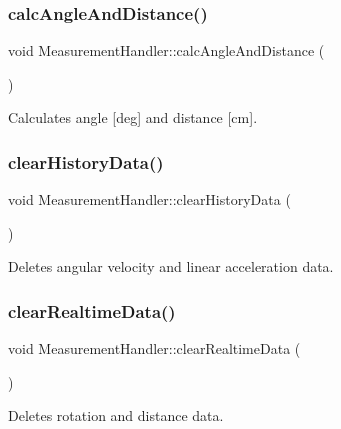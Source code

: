 \subsubsection{\texorpdfstring{calc\+Angle\+And\+Distance()}{calcAngleAndDistance()}}
{\footnotesize\ttfamily void Measurement\+Handler\+::calc\+Angle\+And\+Distance (\begin{DoxyParamCaption}{ }\end{DoxyParamCaption})}



Calculates angle \mbox{[}deg\mbox{]} and distance \mbox{[}cm\mbox{]}. 

\mbox{\label{class_measurement_handler_a4287d2123c6307d6d91790efe03f57a2}} 
\subsubsection{\texorpdfstring{clear\+History\+Data()}{clearHistoryData()}}
{\footnotesize\ttfamily void Measurement\+Handler\+::clear\+History\+Data (\begin{DoxyParamCaption}{ }\end{DoxyParamCaption})}



Deletes angular velocity and linear acceleration data. 

\mbox{\label{class_measurement_handler_a97180ca03e2cbf6735eae197493cb7e9}} 
\subsubsection{\texorpdfstring{clear\+Realtime\+Data()}{clearRealtimeData()}}
{\footnotesize\ttfamily void Measurement\+Handler\+::clear\+Realtime\+Data (\begin{DoxyParamCaption}{ }\end{DoxyParamCaption})}



Deletes rotation and distance data. 

\mbox{\label{class_measurement_handler_a16cda730675bd1c0523327c6fd6a1669}} 
